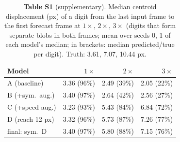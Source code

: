 \begin{table}[H]\centering\small
\caption*{\textbf{Table S1} (supplementary). Median centroid displacement (px) of a digit from the last input frame to the first forecast frame at $1\times$, $2\times$, $3\times$ (digits that form separate blobs in both frames; mean over seeds 0, 1 of each model's median; in brackets: median predicted/true per digit). Truth: 3.61, 7.07, 10.44 px.}
\begin{tabular}{lrrr}\toprule
Model & $1\times$ & $2\times$ & $3\times$ \\ \midrule
A (baseline) & 3.36 (96\%) & 2.49 (39\%) & 2.05 (22\%) \\
B (+sym.\ aug.) & 3.40 (97\%) & 2.64 (42\%) & 2.56 (27\%) \\
C (+speed aug.) & 3.23 (93\%) & 5.43 (84\%) & 6.84 (72\%) \\
D (reach 12 px) & 3.32 (96\%) & 5.73 (87\%) & 7.26 (77\%) \\
final: sym.\ D & 3.40 (97\%) & 5.80 (88\%) & 7.15 (76\%) \\
\bottomrule\end{tabular}\end{table}